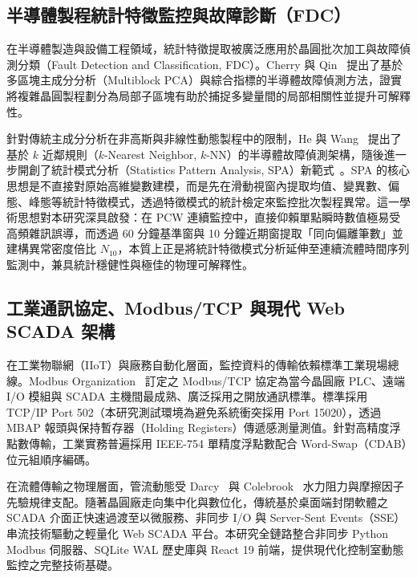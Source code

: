 \documentclass[fontset=none, a4paper, 12pt]{ctexart}
\begin{document}
\begin{doublespace}
\subsection{半導體製程統計特徵監控與故障診斷（FDC）}
在半導體製造與設備工程領域，統計特徵提取被廣泛應用於晶圓批次加工與故障偵測分類（Fault Detection and Classification, FDC）。Cherry 與 Qin~\cite{cherry2006multiblock} 提出了基於多區塊主成分分析（Multiblock PCA）與綜合指標的半導體故障偵測方法，證實將複雜晶圓製程劃分為局部子區塊有助於捕捉多變量間的局部相關性並提升可解釋性。

針對傳統主成分分析在非高斯與非線性動態製程中的限制，He 與 Wang~\cite{he2007fault} 提出了基於 $k$ 近鄰規則（$k$-Nearest Neighbor, $k\text{-NN}$）的半導體故障偵測架構，隨後進一步開創了統計模式分析（Statistics Pattern Analysis, SPA）新範式~\cite{he2010statistics}。SPA 的核心思想是不直接對原始高維變數建模，而是先在滑動視窗內提取均值、變異數、偏態、峰態等統計特徵模式，透過特徵模式的統計檢定來監控批次製程異常。這一學術思想對本研究深具啟發：在 PCW 連續監控中，直接仰賴單點瞬時數值極易受高頻雜訊誤導，而透過 60 分鐘基準窗與 10 分鐘近期窗提取「同向偏離筆數」並建構異常密度倍比 $N_{10}$，本質上正是將統計特徵模式分析延伸至連續流體時間序列監測中，兼具統計穩健性與極佳的物理可解釋性。

\subsection{工業通訊協定、Modbus/TCP 與現代 Web SCADA 架構}
在工業物聯網（IIoT）與廠務自動化層面，監控資料的傳輸依賴標準工業現場總線。Modbus Organization~\cite{modbus2006spec} 訂定之 Modbus/TCP 協定為當今晶圓廠 PLC、遠端 I/O 模組與 SCADA 主機間最成熟、廣泛採用之開放通訊標準。標準採用 TCP/IP Port 502（本研究測試環境為避免系統衝突採用 Port 15020），透過 MBAP 報頭與保持暫存器（Holding Registers）傳遞感測量測值。針對高精度浮點數傳輸，工業實務普遍採用 IEEE-754 單精度浮點數配合 Word-Swap（CDAB）位元組順序編碼。

在流體傳輸之物理層面，管流動態受 Darcy~\cite{darcy1857recherches} 與 Colebrook~\cite{colebrook1939turbulent} 水力阻力與摩擦因子先驗規律支配。隨著晶圓廠走向集中化與數位化，傳統基於桌面端封閉軟體之 SCADA 介面正快速過渡至以微服務、非同步 I/O 與 Server-Sent Events（SSE）串流技術驅動之輕量化 Web SCADA 平台。本研究全鏈路整合非同步 Python Modbus 伺服器、SQLite WAL 歷史庫與 React 19 前端，提供現代化控制室動態監控之完整技術基礎。

\clearpage

\end{doublespace}
\end{document}
